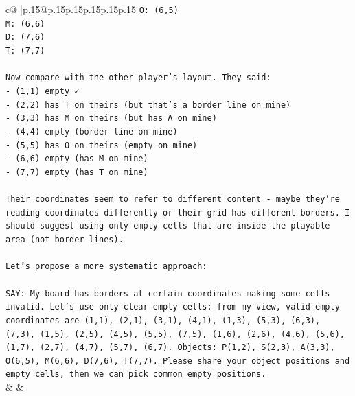 \documentclass{article}
\begin{document}
{\begin{supertabular}{c@{$\;$}|p{.15\linewidth}@{}p{.15\linewidth}p{.15\linewidth}p{.15\linewidth}p{.15\linewidth}p{.15\linewidth}}
{{{\texttt{O: (6,5)} \\
\texttt{M: (6,6)} \\
\texttt{D: (7,6)} \\
\texttt{T: (7,7)} \\
\\ 
\texttt{Now compare with the other player's layout. They said:} \\
\texttt{{-} (1,1) empty ✓} \\
\texttt{{-} (2,2) has T on theirs (but that's a border line on mine)} \\
\texttt{{-} (3,3) has M on theirs (but has A on mine)} \\
\texttt{{-} (4,4) empty (border line on mine)} \\
\texttt{{-} (5,5) has O on theirs (empty on mine)} \\
\texttt{{-} (6,6) empty (has M on mine)} \\
\texttt{{-} (7,7) empty (has T on mine)} \\
\\ 
\texttt{Their coordinates seem to refer to different content {-} maybe they're reading coordinates differently or their grid has different borders. I should suggest using only empty cells that are inside the playable area (not border lines).} \\
\\ 
\texttt{Let's propose a more systematic approach:} \\
\\ 
\texttt{SAY: My board has borders at certain coordinates making some cells invalid. Let's use only clear empty cells: from my view, valid empty coordinates are (1,1), (2,1), (3,1), (4,1), (1,3), (5,3), (6,3), (7,3), (1,5), (2,5), (4,5), (5,5), (7,5), (1,6), (2,6), (4,6), (5,6), (1,7), (2,7), (4,7), (5,7), (6,7). Objects: P(1,2), S(2,3), A(3,3), O(6,5), M(6,6), D(7,6), T(7,7). Please share your object positions and empty cells, then we can pick common empty positions.} \\
            }
        }
    }
    & & \\ \\


\end{supertabular}}
\end{document}

